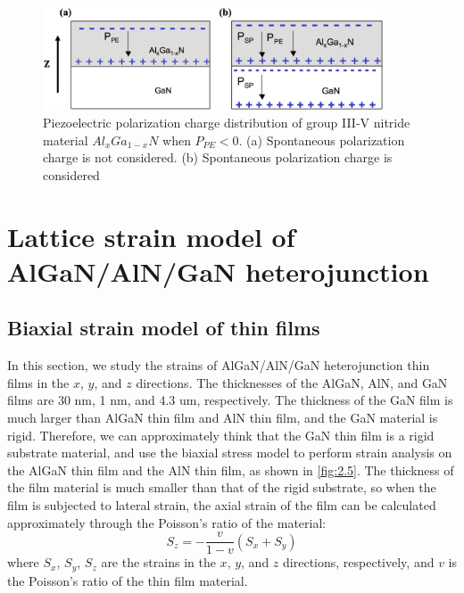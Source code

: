 \begin{figure}[H] 
\centering    
\includegraphics[width=0.9\textwidth]{ch2_4}
\caption[Piezoelectric polarization charge distribution of group III-V nitride material $Al_{x}Ga_{1-x}N$ when $P_{PE}<0$]{Piezoelectric polarization charge distribution of group III-V nitride material $Al_{x}Ga_{1-x}N$ when $P_{PE}<0$. (a) Spontaneous polarization charge is not considered. (b) Spontaneous polarization charge is considered \protect\cite{vetury2000polarization}}
\label{fig:2.4}
\end{figure}

\section{Lattice strain model of AlGaN/AlN/GaN heterojunction}
\label{sec:Lattice strain model of AlGaN/AlN/GaN heterojunction}

\subsection{Biaxial strain model of thin films}
\label{sec:Biaxial strain model of thin films}

In this section, we study the strains  of  AlGaN/AlN/GaN heterojunction thin films  in the $x$, $y$, and $z$ directions. The thicknesses of the AlGaN, AlN, and GaN films are 30 \unit{nm}, 1 \unit{nm}, and 4.3 \unit{um}, respectively. The thickness of the GaN film is much larger than AlGaN thin film  and AlN thin film, and the GaN material is rigid. Therefore, we can approximately think that the GaN thin film is a rigid substrate  material, and use the biaxial stress model  to perform strain  analysis on the AlGaN thin film and the AlN thin film, as shown in \autoref{fig:2.5}. The thickness of the film material is much smaller than that of the rigid substrate, so when the film is subjected to lateral strain, the axial strain of the film can be calculated approximately through the Poisson's ratio  of the material:
\begin{equation}
S_{z}=-\frac{v}{1-v}\left(S_{x}+S_{y}\right)
\label{eq:2.10}
\end{equation}
where $S_{x}$, $S_{y}$, $S_{z}$ are the strains  in the $x$, $y$, and $z$ directions, respectively, and $v$ is the Poisson's ratio  of the thin film  material.

